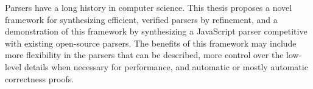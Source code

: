 % 
% 
%
Parsers have a long history in computer science.  This thesis proposes a novel framework for synthesizing efficient, verified parsers by refinement, and a demonstration of this framework by synthesizing a JavaScript parser competitive with existing open-source parsers.  The benefits of this framework may include more flexibility in the parsers that can be described, more control over the low-level details when necessary for performance, and automatic or mostly automatic correctness proofs.
